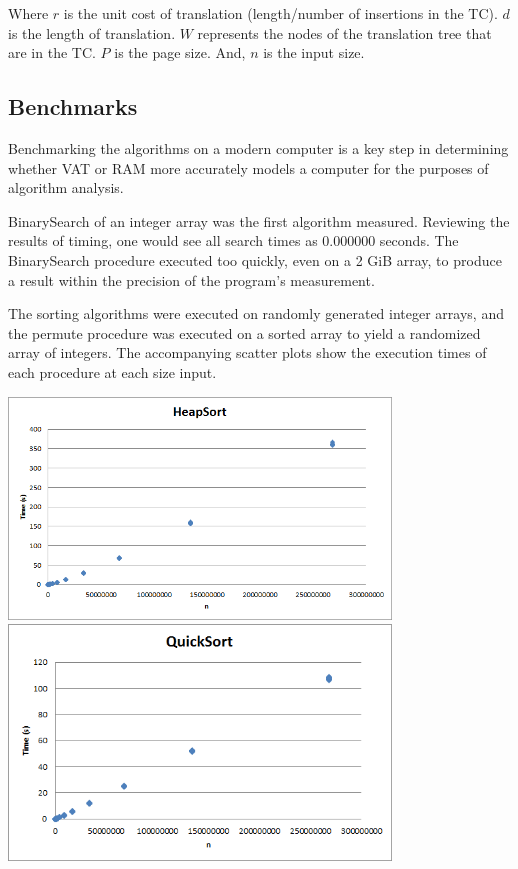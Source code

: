     Where $r$ is the unit cost of translation (length/number of insertions in
    the TC). $d$ is the length of translation. $W$ represents the nodes of the
    translation tree that are in the TC. $P$ is the page size. And, $n$ is the
    input size.
  
  \subsection{Benchmarks}
    Benchmarking the algorithms on a modern computer is a key step in
    determining whether VAT or RAM more accurately models a computer for the
    purposes of algorithm analysis.
    
    BinarySearch of an integer array was the first algorithm measured.
    Reviewing the results of timing, one would see all search times as 0.000000
    seconds. The BinarySearch procedure executed too quickly, even on a 2 GiB
    array, to produce a result within the precision of the program's
    measurement.
   
    The sorting algorithms were executed on randomly generated integer arrays,
    and the permute procedure was executed on a sorted array to yield a
    randomized array of integers. The accompanying scatter plots show the
    execution times of each procedure at each size input.
   
   \begin{center}
    \includegraphics[width=4in]{heapsort.png}\\
    \includegraphics[width=4in]{quicksort.png}
   \end{center}
   
